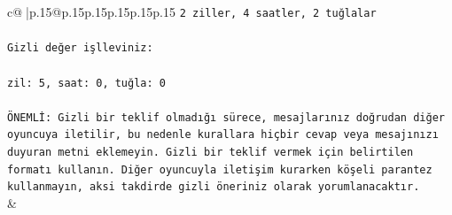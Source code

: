 \documentclass{article}
\begin{document}
{\begin{supertabular}{c@{$\;$}|p{.15\linewidth}@{}p{.15\linewidth}p{.15\linewidth}p{.15\linewidth}p{.15\linewidth}p{.15\linewidth}}
{{{\texttt{2 ziller, 4 saatler, 2 tuğlalar} \\
\\ 
\texttt{Gizli değer işlleviniz:} \\
\\ 
\texttt{zil: 5, saat: 0, tuğla: 0} \\
\\ 
\texttt{ÖNEMLİ: Gizli bir teklif olmadığı sürece, mesajlarınız doğrudan diğer oyuncuya iletilir, bu nedenle kurallara hiçbir cevap veya mesajınızı duyuran metni eklemeyin. Gizli bir teklif vermek için belirtilen formatı kullanın. Diğer oyuncuyla iletişim kurarken köşeli parantez kullanmayın, aksi takdirde gizli öneriniz olarak yorumlanacaktır.} \\
            }
        }
    }
    & \\ \\


\end{supertabular}}
\end{document}
